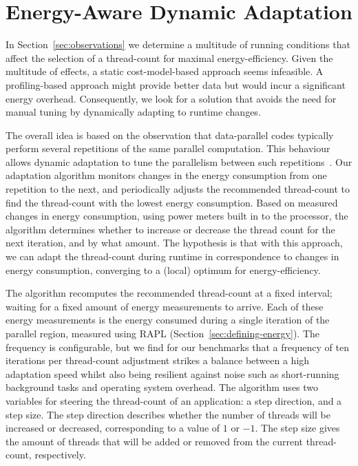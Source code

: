 
\section{Energy-Aware Dynamic Adaptation}\label{sec:implementation}

In Section~\ref{sec:observations} we determine a multitude of running conditions that affect the selection of a thread-count for maximal energy-efficiency.
Given the multitude of effects, a static cost-model-based approach seems infeasible.
A profiling-based approach might provide better data but would incur a significant energy overhead.
Consequently, we look for a solution that avoids the need for manual tuning by dynamically adapting to runtime changes.

The overall idea is based on the observation that data-parallel codes typically perform several repetitions of the same parallel computation.
This behaviour allows dynamic adaptation to tune the parallelism between such repetitions~\cite{sac-mtdynamic}.
Our adaptation algorithm monitors changes in the energy consumption from one repetition to the next, and periodically adjusts the recommended thread-count to find the thread-count with the lowest energy consumption.
Based on measured changes in energy consumption, using power meters built in to the processor, the algorithm determines whether to increase or decrease the thread count for the next iteration, and by what amount.
The hypothesis is that with this approach, we can adapt the thread-count during runtime in correspondence to changes in energy consumption, converging to a (local) optimum for energy-efficiency.

The algorithm recomputes the recommended thread-count at a fixed interval; waiting for a fixed amount of energy measurements to arrive.
Each of these energy measurements is the energy consumed during a single iteration of the parallel region, measured using RAPL (Section~\ref{sec:defining-energy}).
The frequency is configurable, but we find for our benchmarks that a frequency of ten iterations per thread-count adjustment strikes a balance between a high adaptation speed whilst also being resilient against noise such as short-running background tasks and operating system overhead.
The algorithm uses two variables for steering the thread-count of an application: a step direction, and a step size.
The step direction describes whether the number of threads will be increased or decreased, corresponding to a value of $1$ or $-1$.
The step size gives the amount of threads that will be added or removed from the current thread-count, respectively.

